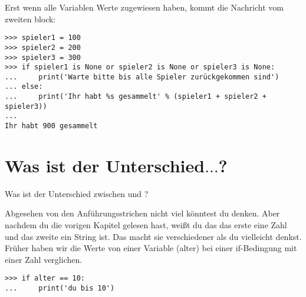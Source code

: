 \noindent
Erst wenn alle Variablen Werte zugewiesen haben, kommt die Nachricht vom zweiten block:

\begin{Verbatim}[frame=single]
>>> spieler1 = 100
>>> spieler2 = 200
>>> spieler3 = 300
>>> if spieler1 is None or spieler2 is None or spieler3 is None:
...     print('Warte bitte bis alle Spieler zurückgekommen sind')
... else:
...     print('Ihr habt %s gesammelt' % (spieler1 + spieler2 + spieler3))
...
Ihr habt 900 gesammelt
\end{Verbatim}

\section{Was ist der Unterschied$\ldots$?}\label{whatsthedifference}

Was ist der Unterschied zwischen  und ?
\par
Abgesehen von den Anführungsstrichen nicht viel könntest du denken.  Aber nachdem du die vorigen Kapitel gelesen hast, weißt du das das erste eine Zahl und das zweite ein String ist. Das macht sie verschiedener als du vielleicht denkst. Früher haben wir die Werte von einer Variable (alter) bei einer if-Bedingung mit einer Zahl verglichen.

\begin{Verbatim}[frame=single]
>>> if alter == 10:
...     print('du bis 10')
\end{Verbatim}

